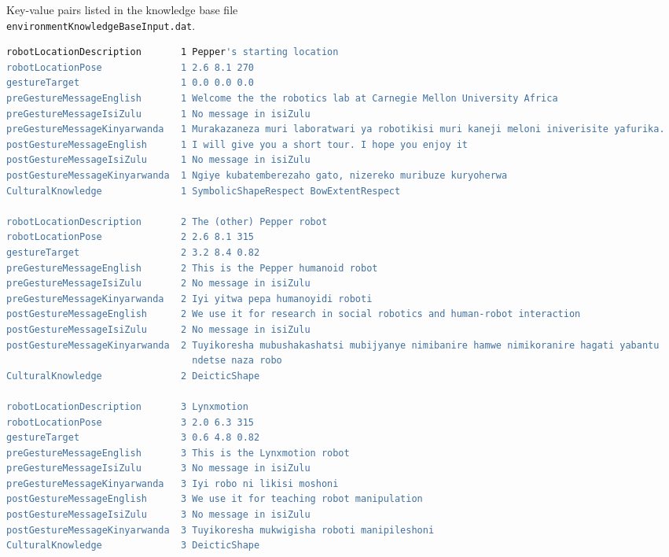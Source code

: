 \documentclass{CSSRforAfrica}
\begin{document}
\begin{table}[H]
\caption{Key-value pairs listed in the knowledge base file\\  {\tt \footnotesize environmentKnowledgeBaseInput.dat}.}
\label{table:environmentKnowledgeBase}
\vspace{0mm}
\begin{lstlisting}[style=withoutNumbering, language=bash]
robotLocationDescription       1 Pepper's starting location
robotLocationPose              1 2.6 8.1 270
gestureTarget                  1 0.0 0.0 0.0
preGestureMessageEnglish       1 Welcome the the robotics lab at Carnegie Mellon University Africa
preGestureMessageIsiZulu       1 No message in isiZulu
preGestureMessageKinyarwanda   1 Murakazaneza muri laboratwari ya robotikisi muri kaneji meloni iniverisite yafurika.
postGestureMessageEnglish      1 I will give you a short tour. I hope you enjoy it
postGestureMessageIsiZulu      1 No message in isiZulu
postGestureMessageKinyarwanda  1 Ngiye kubatemberezaho gato, nizereko muribuze kuryoherwa
CulturalKnowledge              1 SymbolicShapeRespect BowExtentRespect

robotLocationDescription       2 The (other) Pepper robot
robotLocationPose              2 2.6 8.1 315
gestureTarget                  2 3.2 8.4 0.82
preGestureMessageEnglish       2 This is the Pepper humanoid robot
preGestureMessageIsiZulu       2 No message in isiZulu
preGestureMessageKinyarwanda   2 Iyi yitwa pepa humanoyidi roboti
postGestureMessageEnglish      2 We use it for research in social robotics and human-robot interaction
postGestureMessageIsiZulu      2 No message in isiZulu
postGestureMessageKinyarwanda  2 Tuyikoresha mubushakashatsi mubijyanye nimibanire hamwe nimikoranire hagati yabantu
                                 ndetse naza robo
CulturalKnowledge              2 DeicticShape

robotLocationDescription       3 Lynxmotion
robotLocationPose              3 2.0 6.3 315
gestureTarget                  3 0.6 4.8 0.82
preGestureMessageEnglish       3 This is the Lynxmotion robot
preGestureMessageIsiZulu       3 No message in isiZulu
preGestureMessageKinyarwanda   3 Iyi robo ni likisi moshoni
postGestureMessageEnglish      3 We use it for teaching robot manipulation
postGestureMessageIsiZulu      3 No message in isiZulu
postGestureMessageKinyarwanda  3 Tuyikoresha mukwigisha roboti manipileshoni
CulturalKnowledge              3 DeicticShape


\end{lstlisting}
\end{table}
\end{document}
